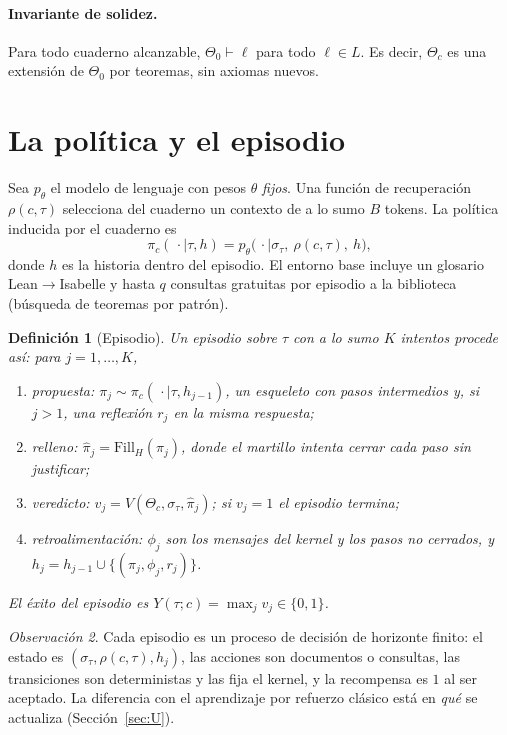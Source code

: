 \documentclass[11pt]{article}
\newtheorem{definition}{Definición}[section]
\theoremstyle{remark}
\newtheorem{remark}[definition]{Observación}
\newcommand{\1}{\mathbb{1}}
\begin{document}
\paragraph{Invariante de solidez.} Para todo cuaderno alcanzable, $\Theta_0\vdash\ell$ para todo $\ell\in L$. Es decir, $\Theta_c$ es una extensión de $\Theta_0$ por teoremas, sin axiomas nuevos.

\section{La política y el episodio}

Sea $p_\theta$ el modelo de lenguaje con pesos $\theta$ \emph{fijos}. Una función de recuperación $\rho(c,\tau)$ selecciona del cuaderno un contexto de a lo sumo $B$ tokens. La política inducida por el cuaderno es
\[
\pi_c(\,\cdot\mid\tau,h)=p_\theta\big(\,\cdot\mid\sigma_\tau,\ \rho(c,\tau),\ h\big),
\]
donde $h$ es la historia dentro del episodio. El entorno base incluye un glosario Lean$\to$Isabelle y hasta $q$ consultas gratuitas por episodio a la biblioteca (búsqueda de teoremas por patrón).

\begin{definition}[Episodio]
Un episodio sobre $\tau$ con a lo sumo $K$ intentos procede así: para $j=1,\dots,K$,
\begin{enumerate}[nosep]
\item \emph{propuesta:} $\pi_j\sim\pi_c(\,\cdot\mid\tau,h_{j-1})$, un esqueleto con pasos intermedios y, si $j>1$, una reflexión $r_j$ en la misma respuesta;
\item \emph{relleno:} $\hat\pi_j=\mathrm{Fill}_H(\pi_j)$, donde el martillo intenta cerrar cada paso sin justificar;
\item \emph{veredicto:} $v_j=V(\Theta_c,\sigma_\tau,\hat\pi_j)$; si $v_j=1$ el episodio termina;
\item \emph{retroalimentación:} $\phi_j$ son los mensajes del kernel y los pasos no cerrados, y $h_j=h_{j-1}\cup\{(\pi_j,\phi_j,r_j)\}$.
\end{enumerate}
El éxito del episodio es $Y(\tau;c)=\max_j v_j\in\{0,1\}$.
\end{definition}

\begin{remark}
Cada episodio es un proceso de decisión de horizonte finito: el estado es $(\sigma_\tau,\rho(c,\tau),h_j)$, las acciones son documentos o consultas, las transiciones son deterministas y las fija el kernel, y la recompensa es $1$ al ser aceptado. La diferencia con el aprendizaje por refuerzo clásico está en \emph{qué} se actualiza (Sección~\ref{sec:U}).
\end{remark}
\end{document}
